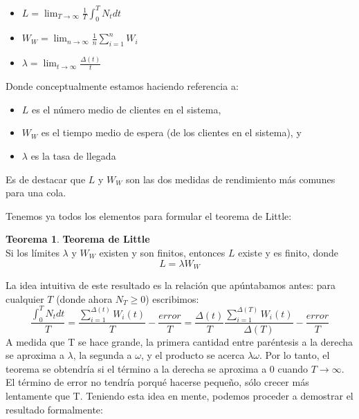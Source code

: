 \documentclass[a4paper,10pt]{scrartcl}
\theoremstyle{definition}
\newtheorem*{theorem*}{Teorema}
\numberwithin{equation}{section}
\begin{document}
\begin{itemize}
 \item $L = \lim_{T\to \infty}\frac{1}{T} \int_{0}^{T} N_t dt$
 \item $W_W = \lim_{n\to \infty}\frac{1}{n} \sum_{i=1}^{n} W_i$
 \item $\lambda = \lim_{t\to \infty}\frac{\Delta(t)}{t}$
\end{itemize}

Donde conceptualmente estamos haciendo referencia a:
\begin{itemize}
 \item $L$ es el número medio de clientes en el sistema,
 \item $W_W$ es el tiempo medio de espera (de los clientes en el sistema), y
 \item $\lambda$ es la tasa de llegada 
\end{itemize}
Es de destacar que  $L$ y $W_W$ son las dos medidas de rendimiento más comunes para una cola.


Tenemos ya todos los elementos para formular el teorema de Little:
\begin{theorem*}{\textbf{Teorema de Little}}\\
Si los límites $\lambda$ y $W_W$ existen y son finitos, entonces $L$ existe y es finito, donde 
\[L = \lambda W_W\]
\end{theorem*}

La idea intuitiva de este resultado es la relación que apúntabamos antes: para cualquier $T$ (donde ahora $N_T \geq 0$) escribimos:
\[ \frac{\int_{0}^{T} N_t dt}{T}=\frac{\sum_{i=1}^{\Delta (t)} W_i(t)}{T}-\frac{error}{T}=\frac{\Delta(t)}{T}\frac{\sum_{i=1}^{\Delta (T)} W_i(t)}{\Delta(T)}-\frac{error}{T}   \]
A medida que T se hace grande, la primera cantidad entre paréntesis a la derecha se aproxima a $\lambda$, la segunda a $\omega$, 
y el producto se acerca $\lambda\omega$. Por lo tanto, el teorema se obtendría si el término a la derecha 
se aproxima a 0 cuando $T\rightarrow\infty$. El término de error no tendría porqué hacerse pequeño, 
sólo crecer más lentamente que T.
Teniendo esta idea en mente, podemos proceder a demostrar el resultado formalmente:
\end{document}
